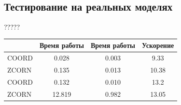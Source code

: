 \subsection{Тестирование на реальных моделях}
?????

\vspace{10pt}

\begin{tabular}{||l||c|c|c||}
\hline
\hline
& Время работы & Время работы & Ускорение \\
\hline
\hline
COORD & 0.028 & 0.003 & 9.33 \\
\hline
ZCORN & 0.135 & 0.013 & 10.38 \\
\hline
COORD & 0.132 &  0.010 & 13.2 \\
\hline
ZCORN & 12.819 & 0.982 & 13.05 \\
\hline
\hline
\end{tabular}

